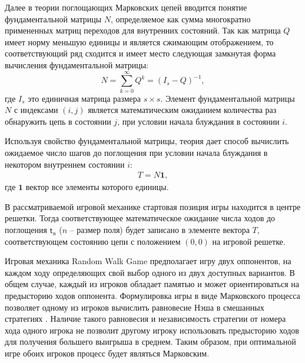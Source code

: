 Далее в теории поглощающих Марковских цепей вводится понятие фундаментальной матрицы $N$, определяемое как сумма многократно примененных матриц переходов для внутренних состояний. Так как матрица $Q$ имеет норму меньшую единицы и является сжимающим отображением, то соответствующий ряд сходится и имеет место следующая замкнутая форма вычисления фундаментальной матрицы:
\begin{equation}
    N=\sum_{k=0}^{\infty} Q^k=(I_s-Q)^{-1},
    \label{eq:N}
\end{equation}
где $I_s$ это единичная матрица размера $s \times s$. Элемент фундаментальной матрицы $N$ с индексами $(i, j)$ является математическим ожиданием количества раз обнаружить цепь в состоянии $j$, при условии начала блуждания в состоянии $i$.

Используя свойство фундаментальной матрицы, теория дает способ вычислить ожидаемое число шагов до поглощения при условии начала блуждания в некотором внутреннем состоянии $i$:
\begin{equation}
    \begin{aligned}
    T=N\textbf{1},
    \label{eq:T}
    \end{aligned}
\end{equation}
где $\textbf{1}$ вектор все элементы которого единицы.

В рассматриваемой игровой механике стартовая позиция игры находится в центре решетки. Тогда соответствующее математическое ожидание числа ходов до поглощения $\boldsymbol{\mathsf{t_n}}$ ($n$ -- размер поля) будет записано в элементе вектора $T$, соответствующем состоянию цепи с положением $(0, 0)$ на игровой решетке.

Игровая механика Random Walk Game предполагает игру двух оппонентов, на каждом ходу определяющих свой выбор одного из двух доступных вариантов. В общем случае, каждый из игроков обладает памятью и может ориентироваться на предысторию ходов оппонента. Формулировка игры в виде Марковского процесса позволяет одному из игроков вычислить равновесие Нэша в смешанных стратегиях \cite{nash_non-cooperative_1951}. Наличие такого равновесия и независимость стратегии от номера хода одного игрока не позволит другому игроку использовать предысторию ходов для получения большего выигрыша в среднем. Таким образом, при оптимальной игре обоих игроков процесс будет являться Марковским.

